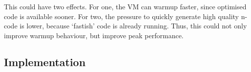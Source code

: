 This could have two effects. For one, the VM can warmup faster, since optimised
code is available sooner. For two, the pressure to quickly generate high quality
n-code is lower, because `fastish' code is already running. Thus, this could not
only improve warmup behaviour, but improve peak performance.


\subsection{Implementation}

